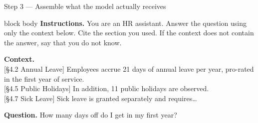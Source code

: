 \documentclass[aspectratio=169,11pt]{beamer}
\begin{document}
\begin{frame}{Step 3 --- Assemble what the model actually receives}
  \begin{beamercolorbox}[sep=9pt,rounded=true]{block body}
    \small
    \textbf{\color{ragblue}Instructions.}
    You are an HR assistant. Answer the question using only the context
    below. Cite the section you used. If the context does not contain the
    answer, say that you do not know.

    \medskip
    \textbf{\color{ragorange}Context.}\\
    {}[\S4.2 Annual Leave] Employees accrue 21 days of annual leave per year,
    pro-rated in the first year of service.\\
    {}[\S4.5 Public Holidays] In addition, 11 public holidays are observed.\\
    {}[\S4.7 Sick Leave] Sick leave is granted separately and requires\dots

    \medskip
    \textbf{\color{raggreen}Question.}
    How many days off do I get in my first year?
  \end{beamercolorbox}
  \medskip
  \centering\small\color{raggray}
\end{frame}
\end{document}
